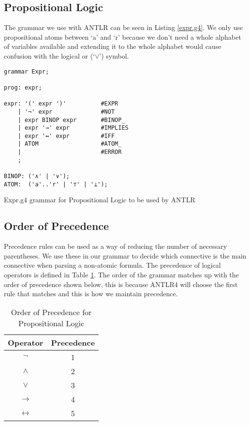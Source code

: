 \documentclass{report}
\begin{document}
\subsection{Propositional Logic}

The grammar we use with ANTLR can be seen in Listing \ref{expr.g4}. We only use propositional atoms between `a' and `r' because we don't need a whole alphabet of variables available and extending it to the whole alphabet would cause confusion with the logical or (`$\lor$') symbol. 

\begin{listing}[ht]
\begin{verbatim}
grammar Expr;   

prog: expr;

expr: '(' expr ')'          #EXPR
    | '¬' expr              #NOT
    | expr BINOP expr       #BINOP_
    | expr '→' expr         #IMPLIES
    | expr '↔' expr         #IFF
    | ATOM                  #ATOM_
    |                       #ERROR
    ;

BINOP: ('∧' | '∨');
ATOM:  ('a'..'r' | '⊤' | '⊥');

\end{verbatim}
\caption{Expr.g4 grammar for Propositional Logic to be used by ANTLR}
\label{expr.g4}
\end{listing}

\subsection{Order of Precedence}

Precedence rules can be used as a way of reducing the number of necessary parentheses. We use these in our grammar to decide which connective is the main connective when parsing a non-atomic formula. The precedence of logical operators is defined in Table \ref{orderofprecendence}. The order of the grammar matches up with the order of precedence shown below, this is because ANTLR4 will choose the first rule that matches and this is how we maintain precedence.

\begin{table}[h]
\begin{center}
\begin{tabular}{|| c | c ||}
    \hline
    Operator & Precedence \\ \hline 
    $\lnot$  & 1 \\
    $\land$  & 2 \\
    $\lor$   & 3 \\
    $\to$    & 4 \\
    $\leftrightarrow$ & 5 \\ \hline
\end{tabular}
\caption{Order of Precedence for Propositional Logic}
\label{orderofprecendence}
\end{center}
\end{table}
\end{document}
